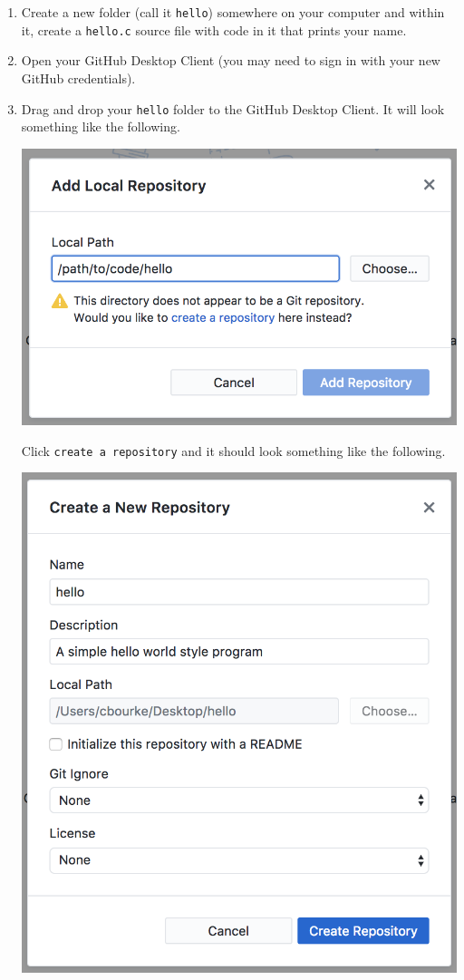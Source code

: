 \documentclass[12pt]{scrartcl}
\begin{document}
\begin{enumerate}
  \item Create a new folder (call it \texttt{hello}) somewhere 
  on your computer and within it, 
  create a \texttt{hello.c} source file with code in it that
  prints your name.
  
  \item Open your GitHub Desktop Client (you may need to sign in with your
  new GitHub credentials).
  
  \item Drag and drop your \texttt{hello} folder to the GitHub Desktop
  Client.  It will look something like the following.
  \begin{center}
  \includegraphics[scale=0.50]{./hack1.0-files/drag.png}
  \end{center}
  Click \texttt{create a repository} and it should look something
  like the following.
  \begin{center}
  \includegraphics[scale=0.35]{./hack1.0-files/setup.png}

\end{center}
\end{enumerate}
\end{document}
